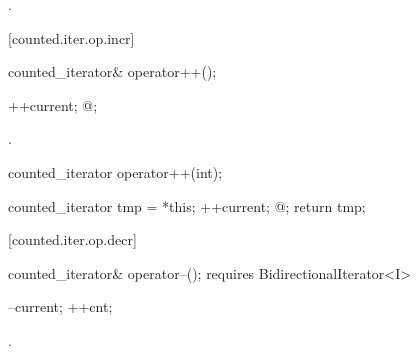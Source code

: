 \begin{addedblock}
\begin{itemdescr}
\pnum
\returns {}.
\end{itemdescr}

[counted.iter.op.incr]{}

%
%
\begin{itemdecl}
counted_iterator& operator++();
\end{itemdecl}

\begin{itemdescr}
\pnum
\requires {}

\pnum
\effects
\begin{codeblock}
++current;
@\dcr@cnt;
\end{codeblock}

\pnum
\returns {}.
\end{itemdescr}

%
%
\begin{itemdecl}
counted_iterator operator++(int);
\end{itemdecl}

\begin{itemdescr}
\pnum
\requires {}

\pnum
\effects
\begin{codeblock}
counted_iterator tmp = *this;
++current;
@\dcr@cnt;
return tmp;
\end{codeblock}
\end{itemdescr}

[counted.iter.op.decr]{}

%
%
\begin{itemdecl}
  counted_iterator& operator--();
    requires BidirectionalIterator<I>
\end{itemdecl}

\begin{itemdescr}
\pnum
\effects
\begin{codeblock}
--current;
++cnt;
\end{codeblock}

\pnum
\returns {}.
\end{itemdescr}


\end{addedblock}
